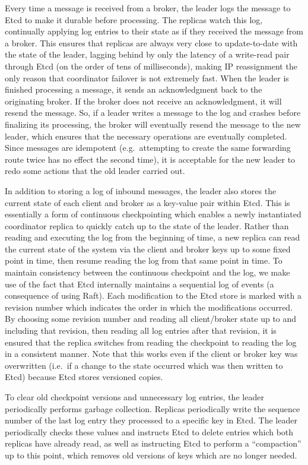 Every time a message is received from a broker, the leader logs the message to Etcd to make it durable before processing.
The replicas watch this log, continually applying log entries to their state as if they received the message from a broker.
This ensures that replicas are always very close to update-to-date with the state of the leader, lagging behind by only the latency of a write-read pair through Etcd (on the order of tens of milliseconds), making IP reassignment the only reason that coordinator failover is not extremely fast.
When the leader is finished processing a message, it sends an acknowledgment back to the originating broker.
If the broker does not receive an acknowledgment, it will resend the message.
So, if a leader writes a message to the log and crashes before finalizing its processing, the broker will eventually resend the message to the new leader, which ensures that the necessary operations are eventually completed.
Since messages are idempotent (e.g.\ attempting to create the same forwarding route twice has no effect the second time), it is acceptable for the new leader to redo some actions that the old leader carried out.

In addition to storing a log of inbound messages, the leader also stores the current state of each client and broker as a key-value pair within Etcd.
This is essentially a form of continuous checkpointing which enables a newly instantiated coordinator replica to quickly catch up to the state of the leader.
Rather than reading and executing the log from the beginning of time, a new replica can read the current state of the system via the client and broker keys up to some fixed point in time, then resume reading the log from that same point in time.
To maintain consistency between the continuous checkpoint and the log, we make use of the fact that Etcd internally maintains a sequential log of events (a consequence of using Raft).
Each modification to the Etcd store is marked with a revision number which indicates the order in which the modifications occurred.
By choosing some revision number and reading all client/broker state up to and including that revision, then reading all log entries after that revision, it is ensured that the replica switches from reading the checkpoint to reading the log in a consistent manner.
Note that this works even if the client or broker key was overwritten (i.e.\ if a change to the state occurred which was then written to Etcd) because Etcd stores versioned copies.

To clear old checkpoint versions and unnecessary log entries, the leader periodically performs garbage collection.
Replicas periodically write the sequence number of the last log entry they processed to a specific key in Etcd.
The leader periodically checks these values and instructs Etcd to delete entries which both replicas have already read, as well as instructing Etcd to perform a ``compaction'' up to this point, which removes old versions of keys which are no longer needed.

